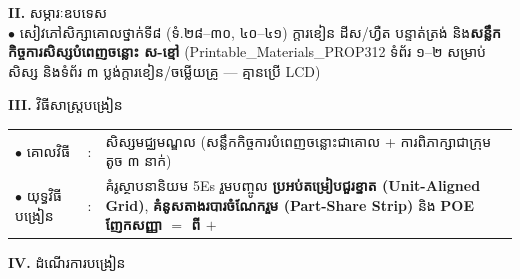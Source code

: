 \documentclass[a4paper,10pt]{article}
\newcommand{\en}[1]{{\TimesEn #1}}
\begin{document}
{\vspace{2pt}

\textbf{II.} {\muol សម្ភារៈឧបទេស}\\[1pt]
\hspace*{0.55cm}$\bullet$ \hspace{0.35cm} សៀវភៅសិក្សាគោលថ្នាក់ទី៨ (ទំ.២៨–៣០, ៤០–៤១) ក្ដារខៀន ដីស/ហ្វឺត បន្ទាត់ត្រង់ និង\textbf{សន្លឹកកិច្ចការសិស្សបំពេញចន្លោះ ស-ខ្មៅ} (\en{Printable\_Materials\_PROP312} ទំព័រ ១–២ សម្រាប់សិស្ស និងទំព័រ ៣ ប្លង់ក្ដារខៀន/ចម្លើយគ្រូ — គ្មានប្រើ \en{LCD})

\vspace{2pt}

\textbf{III.} {\muol វិធីសាស្រ្តបង្រៀន}\\[1pt]
\hspace*{0.45cm}%
\begin{tabular}{@{}l l L{14.85cm}@{}}
  $\bullet$ \hspace{0.25cm} គោលវិធី & : & សិស្សមជ្ឈមណ្ឌល (សន្លឹកកិច្ចការបំពេញចន្លោះជាគោល + ការពិភាក្សាជាក្រុមតូច ៣ នាក់) \\
  $\bullet$ \hspace{0.25cm} យុទ្ធវិធីបង្រៀន & : & គំរូស្ថាបនានិយម \en{5Es} រួមបញ្ចូល \textbf{ប្រអប់តម្រៀបជួរខ្នាត (\en{Unit-Aligned Grid})}, \textbf{គំនូសតាងរបារចំណែករួម (\en{Part-Share Strip})} និង \textbf{\en{POE} ញែកសញ្ញា $=$ ពី $+$} \\
\end{tabular}
}

\vspace{2pt}

\textbf{IV.} {\muol ដំណើរការបង្រៀន}

\vspace{1pt}
\end{document}
